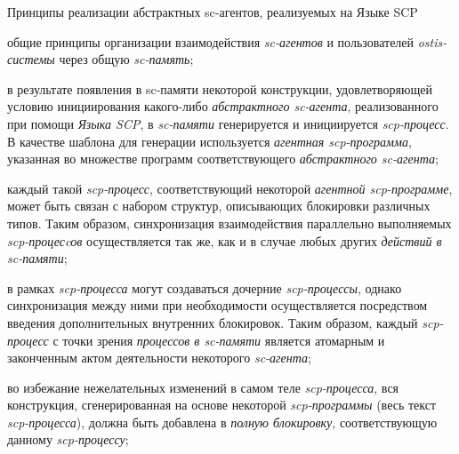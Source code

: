 \begin{frame}{Принципы реализации абстрактных sc-агентов, реализуемых на Языке SCP}
\topline
\topline
\justifying
\vspace{10mm}

    \begin{textitemize}
    \item общие принципы организации взаимодействия \textit{sc-агентов} и пользователей \textit{ostis-системы} через общую \textit{sc-память};
\item в результате появления в sc-памяти некоторой конструкции, удовлетворяющей условию инициирования какого-либо \textit{абстрактного sc-агента}, реализованного при помощи \textit{Языка SCP}, в \textit{sc-памяти} генерируется и инициируется \textit{scp-процесс}. В качестве шаблона для генерации используется \textit{агентная scp-программа}, указанная во множестве программ соответствующего \textit{абстрактного sc-агента};
\item каждый такой \textit{scp-процесс}, соответствующий некоторой \textit{агентной scp-программе}, может быть связан с набором структур, описывающих блокировки различных типов. Таким образом, синхронизация взаимодействия параллельно выполняемых \textit{scp-процесcов} осуществляется так же, как и в случае любых других \textit{действий в sc-памяти};
\end{textitemize}
\end{frame}

\begin{frame}{}
\topline
\justifying
\vspace{10mm}

	
\begin{textitemize}
    \item в рамках \textit{scp-процесса} могут создаваться дочерние \textit{scp-процессы}, однако синхронизация между ними при необходимости осуществляется посредством введения дополнительных внутренних блокировок. Таким образом, каждый \textit{scp-процесс} с точки зрения \textit{процессов в sc-памяти} является атомарным и законченным актом деятельности некоторого \textit{sc-агента};
    \item во избежание нежелательных изменений в самом теле \textit{scp-процесса}, вся конструкция, сгенерированная на основе некоторой \textit{scp-программы} (весь текст \textit{scp-процесса}), должна быть добавлена в \textit{полную блокировку}, соответствующую данному \textit{scp-процессу};
\end{textitemize}
\end{frame}

